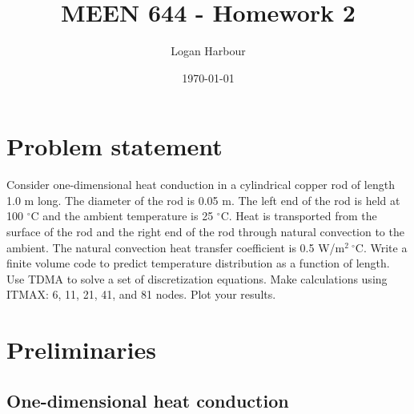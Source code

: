\documentclass{article}
\newcommand{\pageTitle}{MEEN 644 - Homework 2}
\newcommand{\pageAuthor}{Logan Harbour}
\begin{document}
\title{\LARGE \textbf{\pageTitle} \vspace{-0.3cm}}
\author{\large \pageAuthor}
\date{\vspace{-0.6cm} \large \today \vspace{-0.4cm}}

\maketitle

\section*{Problem statement}

Consider one-dimensional heat conduction in a cylindrical copper rod of length 1.0 m long. The diameter of the rod is 0.05 m. The left end of the rod is held at 100 $^\circ$C and the ambient temperature is 25 $^\circ$C. Heat is transported from the surface of the rod and the right end of the rod through natural convection to the ambient. The natural convection heat transfer coefficient is 0.5 W/m$^2~^\circ$C. Write a finite volume code to predict temperature distribution as a function of length. Use TDMA to solve a set of discretization equations. Make calculations using ITMAX: 6, 11, 21, 41, and 81 nodes. Plot your results.

\section*{Preliminaries}

\subsection*{One-dimensional heat conduction}
\end{document}
